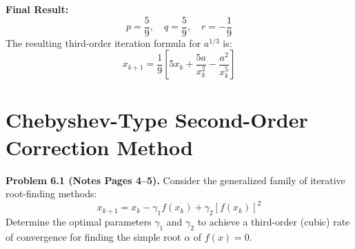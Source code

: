 \documentclass[11pt,a4paper]{article}
\numberwithin{equation}{section}
\begin{document}
\begin{solbox}
\noindent\textbf{Final Result:}
\begin{equation}
    \boxed{p = \frac{5}{9}, \quad q = \frac{5}{9}, \quad r = -\frac{1}{9}}
\end{equation}
The resulting third-order iteration formula for $a^{1/3}$ is:
\begin{equation}
    x_{k+1} = \frac{1}{9} \left[ 5 x_k + \frac{5a}{x_k^2} - \frac{a^2}{x_k^5} \right]
\end{equation}
\end{solbox}

\section{Chebyshev-Type Second-Order Correction Method}

\begin{thmbox}
\textbf{Problem 6.1 (Notes Pages 4--5).}
Consider the generalized family of iterative root-finding methods:
\begin{equation}
    x_{k+1} = x_k - \gamma_1 f(x_k) + \gamma_2 [f(x_k)]^2 \tag{6.1}
\end{equation}
Determine the optimal parameters $\gamma_1$ and $\gamma_2$ to achieve a third-order (cubic) rate of convergence for finding the simple root $\alpha$ of $f(x) = 0$.
\end{thmbox}
\end{document}
